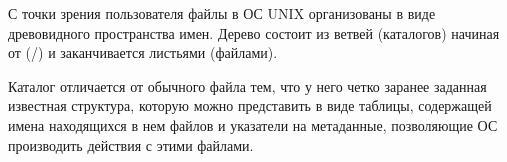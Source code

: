 С точки зрения пользователя файлы в ОС UNIX организованы в виде древовидного пространства имен. Дерево состоит из ветвей (каталогов) начиная от (/) и заканчивается листьями (файлами).

Каталог отличается от обычного файла тем, что у него четко заранее заданная известная структура, которую можно представить в виде таблицы, содержащей имена находящихся в нем файлов и указатели на метаданные, позволяющие ОС производить действия с этими файлами.
